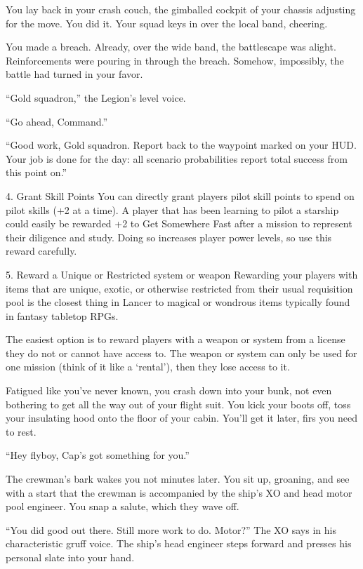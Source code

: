 You lay back in your crash couch, the gimballed cockpit of your chassis adjusting for the move.
You did it. Your squad keys in over the local band, cheering.

You made a breach. Already, over the wide band, the battlescape was alight. Reinforcements
were pouring in through the breach. Somehow, impossibly, the battle had turned in your favor.

``Gold squadron,'' the Legion’s level voice.

``Go ahead, Command.''

``Good work, Gold squadron. Report back to the waypoint marked on your HUD. Your job is done
for the day: all scenario probabilities report total success from this point on.''


4. Grant Skill Points
You can directly grant players pilot skill points to spend on pilot skills (+2 at a time). A player that
has been learning to pilot a starship could easily be rewarded +2 to Get Somewhere Fast after a
mission to represent their diligence and study. Doing so increases player power levels, so use
this reward carefully.


5. Reward a Unique or Restricted system or weapon
Rewarding your players with items that are unique, exotic, or otherwise restricted from their usual
requisition pool is the closest thing in Lancer to magical or wondrous items typically found in
fantasy tabletop RPGs.


The easiest option is to reward players with a weapon or system from a license they do not
or cannot have access to. The weapon or system can only be used for one mission (think of it
like a `rental'), then they lose access to it.


Fatigued like you’ve never known, you crash down into your bunk, not even bothering to get all
the way out of your flight suit. You kick your boots off, toss your insulating hood onto the floor of
your cabin. You’ll get it later, firs you need to rest.

``Hey flyboy, Cap’s got something for you.''

The crewman’s bark wakes you not minutes later. You sit up, groaning, and see with a start that
the crewman is accompanied by the ship’s XO and head motor pool engineer. You snap a salute,
which they wave off.

``You did good out there. Still more work to do. Motor?'' The XO says in his characteristic gruff
voice. The ship’s head engineer steps forward and presses his personal slate into your hand.

